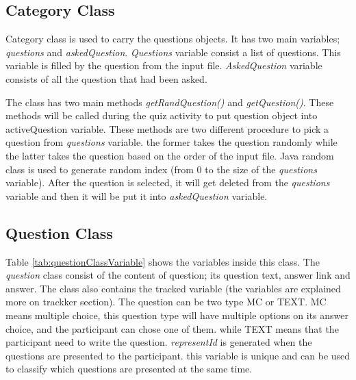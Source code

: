 \subsection{Category Class}
Category class is used to carry the questions objects.
It has two main variables; \textit{questions} and \textit{askedQuestion}.
\textit{Questions} variable consist a list of questions. This variable is filled by
the question from the input file.
\textit{AskedQuestion} variable consists of all the question that had been asked.

The class has two main methods \textit{getRandQuestion()} and \textit{getQuestion()}.
These methods will be called during the quiz activity to put question object into activeQuestion variable.
These methods are two different procedure to pick a question from \textit{questions} variable.
the former takes the question randomly while the latter takes the question based on the order of the input file.
Java random class is used to generate random index (from 0 to the size of the \textit{questions} variable).
After the question is selected, it will get deleted from the \textit{questions} variable and then it will be put it into \textit{askedQuestion} variable.

\subsection{Question Class}
Table \ref{tab:questionClassVariable} shows the variables inside this class.
The \textit{question} class consist of the content of question; its question text, answer link and answer.
The class also contains the tracked variable (the variables are explained more on trackker section).
The question can be two type MC or TEXT. MC means multiple choice, this question type will have multiple options on its answer choice,
and the participant can chose one of them. while TEXT means that the participant need to write the question.
\textit{representId} is generated when the questions are presented to the participant. this variable is unique and can
be used to classify which questions are presented at the same time.

